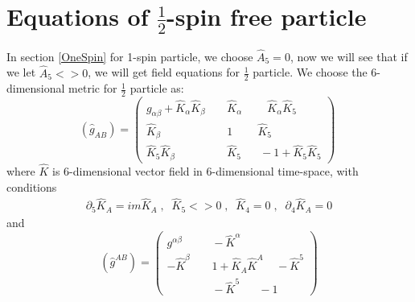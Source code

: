 \documentclass[twocolumn,showpacs,preprintnumbers,amsmath,amssymb]{revtex4}
\begin{document}
\section{Equations of $\frac{1}{2}$-spin free particle} \label{halfSpin}

In section \ref{OneSpin} for 1-spin particle, we choose $\hat{A}_{5} = 0$, now we will see that if we 
let $\hat{A}_{5} <> 0$, we will get field equations for $\frac{1}{2}$ particle. We choose the 6-dimensional metric
for  $\frac{1}{2}$ particle as: 
\begin{equation}
\left( \hat{g}_{AB} \right) = \left( \begin{array}{cc}
   g_{\alpha\beta} + \hat{K}_{\alpha} \hat{K}_{\beta} \; \; & \; \; 
      \hat{K}_{\alpha} \; \; \; \; \; \;  \; \;  \hat{K}_{\alpha} \hat{K}_{5} \\
    \hat{K}_{\beta} \; \;  & \; \; 
     1 \; \; \; \; \; \;  \; \;   \hat{K}_5  \\ 
   \hat{K}_{5} \hat{K}_{\beta} \; \; & \; \;  \hat{K}_5 \; \; \; \;  \; \;  -1+\hat{K}_{5} \hat{K}_{5}  \end{array} \right) \;
\label{6dMetricHalfS}
\end{equation}
where $\hat{K}$ is 6-dimensional vector field in 6-dimensional time-space, with conditions
\begin{eqnarray}
\partial_5 \hat{K}_{A} = im \hat{K}_{A} \;, \; \; \hat{K}_5 <> 0 \;, \; \; \hat{K}_4 = 0 \;, \; \; \partial_4 \hat{K}_A = 0 
\end{eqnarray}
and 
\begin{equation}
\left( \hat{g}^{AB} \right) = \left( \begin{array}{cc}
   g^{\alpha\beta}  \; \;  & \; \; 
    - \hat{K}^{\alpha} \; \; \;  \; \; \; \\
   - \hat{K}^{\beta} \; \;  & \; \; 
     1+\hat{K}_{A}\hat{K}^{A} \; \; \; \;- \hat{K}^{5}\\
 \; \;  & \; \;  - \hat{K}^{5} \; \; \; \; \; \;   -1  \end{array} \right) 
\label{6dMetricHalfS_i}
\end{equation}
\end{document}

